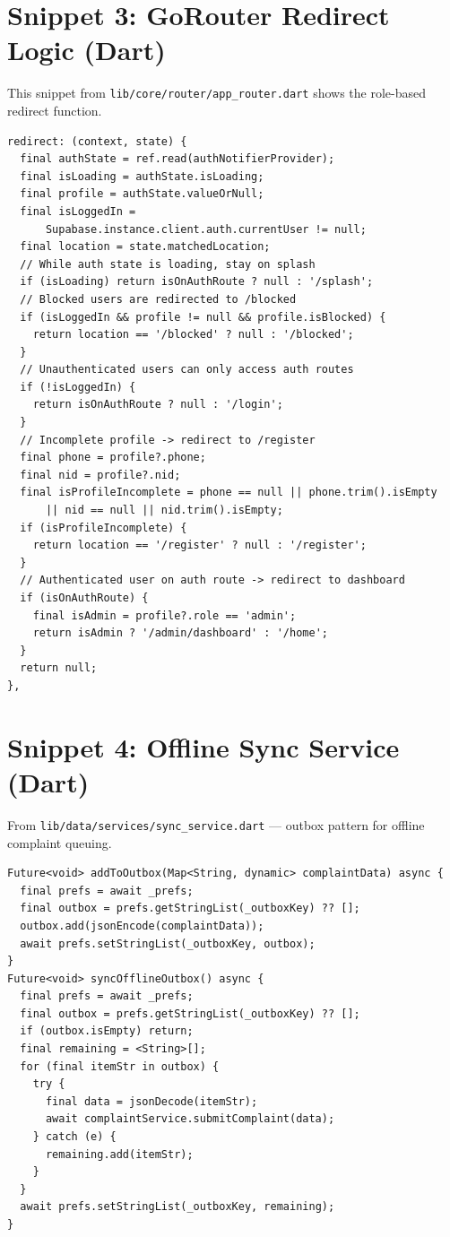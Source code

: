 \documentclass[12pt, a4paper, twoside]{report}
\begin{document}
\section*{Snippet 3: GoRouter Redirect Logic (Dart)}
This snippet from \texttt{lib/core/router/app\_router.dart} shows the role-based redirect function.
\begin{footnotesize}
\begin{verbatim}
redirect: (context, state) {
  final authState = ref.read(authNotifierProvider);
  final isLoading = authState.isLoading;
  final profile = authState.valueOrNull;
  final isLoggedIn = 
      Supabase.instance.client.auth.currentUser != null;
  final location = state.matchedLocation;
  // While auth state is loading, stay on splash
  if (isLoading) return isOnAuthRoute ? null : '/splash';
  // Blocked users are redirected to /blocked
  if (isLoggedIn && profile != null && profile.isBlocked) {
    return location == '/blocked' ? null : '/blocked';
  }
  // Unauthenticated users can only access auth routes
  if (!isLoggedIn) {
    return isOnAuthRoute ? null : '/login';
  }
  // Incomplete profile -> redirect to /register
  final phone = profile?.phone;
  final nid = profile?.nid;
  final isProfileIncomplete = phone == null || phone.trim().isEmpty 
      || nid == null || nid.trim().isEmpty;
  if (isProfileIncomplete) {
    return location == '/register' ? null : '/register';
  }
  // Authenticated user on auth route -> redirect to dashboard
  if (isOnAuthRoute) {
    final isAdmin = profile?.role == 'admin';
    return isAdmin ? '/admin/dashboard' : '/home';
  }
  return null;
},
\end{verbatim}
\end{footnotesize}
\vspace{1cm}
\section*{Snippet 4: Offline Sync Service (Dart)}
From \texttt{lib/data/services/sync\_service.dart} --- outbox pattern for offline complaint queuing.
\begin{footnotesize}
\begin{verbatim}
Future<void> addToOutbox(Map<String, dynamic> complaintData) async {
  final prefs = await _prefs;
  final outbox = prefs.getStringList(_outboxKey) ?? [];
  outbox.add(jsonEncode(complaintData));
  await prefs.setStringList(_outboxKey, outbox);
}
Future<void> syncOfflineOutbox() async {
  final prefs = await _prefs;
  final outbox = prefs.getStringList(_outboxKey) ?? [];
  if (outbox.isEmpty) return;
  final remaining = <String>[];
  for (final itemStr in outbox) {
    try {
      final data = jsonDecode(itemStr);
      await complaintService.submitComplaint(data);
    } catch (e) {
      remaining.add(itemStr);
    }
  }
  await prefs.setStringList(_outboxKey, remaining);
}
\end{verbatim}
\end{footnotesize}
\vspace{1cm}
\end{document}
